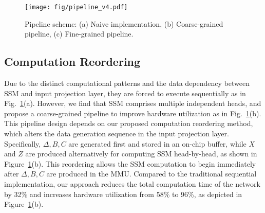 \begin{figure}[!tb]
    \centering
    \texttt{[image: fig/pipeline\_v4.pdf]}
    \vspace{-20pt}
    \caption{Pipeline scheme: (a) Naive implementation, (b) Coarse-grained pipeline, (c) Fine-grained pipeline.}
    \label{fig: Pipeline scheme}
\end{figure}

\subsection{Computation Reordering}
\label{subsec:pipeline}

Due to the distinct computational patterns
and the data dependency between SSM and input projection layer,
they are forced to execute sequentially as in Fig.~\ref{fig: Pipeline scheme}(a).
However, we find that SSM comprises multiple independent heads, and propose a coarse-grained pipeline to improve hardware utilization as in Fig.~\ref{fig: Pipeline scheme}(b). 
This pipeline design depends on our proposed computation reordering method, which alters the data generation sequence in the input projection layer. 
Specifically, $\Delta, B, C$ are generated first and stored in an on-chip buffer, while $X$ and $Z$ are produced alternatively for computing SSM head-by-head, as shown in Figure~\ref{fig: Pipeline scheme}(b).
This reordering allows the SSM computation to begin immediately after $\Delta, B, C$ are produced in the MMU. Compared to the traditional sequential implementation, our approach reduces the total computation time of the network by 32\% and increases hardware utilization from 58\% to 96\%, as depicted in Figure~\ref{fig: Pipeline scheme}(b).


